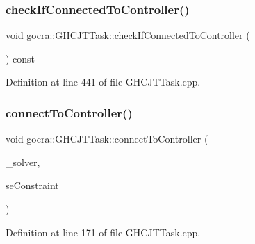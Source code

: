 \hypertarget{classgocra_1_1GHCJTTask_a70e6514d810197ee94af36959061982e}{}\label{classgocra_1_1GHCJTTask_a70e6514d810197ee94af36959061982e} 
\subsubsection{\texorpdfstring{check\+If\+Connected\+To\+Controller()}{checkIfConnectedToController()}}
{\footnotesize\ttfamily void gocra\+::\+G\+H\+C\+J\+T\+Task\+::check\+If\+Connected\+To\+Controller (\begin{DoxyParamCaption}{ }\end{DoxyParamCaption}) const\hspace{0.3cm}{\ttfamily [protected]}}



Definition at line 441 of file G\+H\+C\+J\+T\+Task.\+cpp.

\hypertarget{classgocra_1_1GHCJTTask_a021f21b19d0d9de1c067192166f852e6}{}\label{classgocra_1_1GHCJTTask_a021f21b19d0d9de1c067192166f852e6} 
\subsubsection{\texorpdfstring{connect\+To\+Controller()}{connectToController()}}
{\footnotesize\ttfamily void gocra\+::\+G\+H\+C\+J\+T\+Task\+::connect\+To\+Controller (\begin{DoxyParamCaption}\item[{\hyperlink{classocra_1_1OneLevelSolver}{ocra\+::\+One\+Level\+Solver} \&}]{\+\_\+solver,  }\item[{\hyperlink{classocra_1_1SumOfLinearFunctions}{Sum\+Of\+Linear\+Functions} \&}]{se\+Constraint }\end{DoxyParamCaption})\hspace{0.3cm}{\ttfamily [protected]}}



Definition at line 171 of file G\+H\+C\+J\+T\+Task.\+cpp.

\hypertarget{classgocra_1_1GHCJTTask_a5caec6472d19926a2448779fa629c9d8}{}\label{classgocra_1_1GHCJTTask_a5caec6472d19926a2448779fa629c9d8} 
